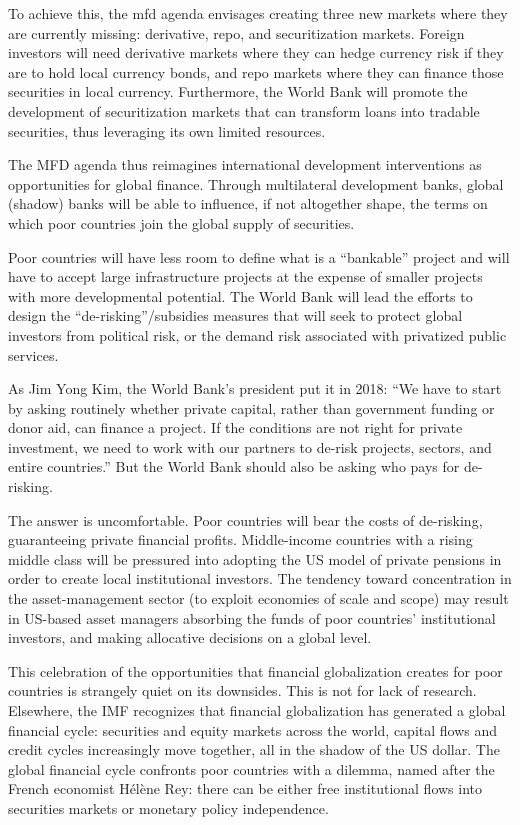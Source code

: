 \documentclass[
]{book}
\begin{document}
To achieve this, the mfd agenda envisages creating three new markets where they are currently missing: derivative, repo, and securitization markets. Foreign investors will need derivative markets where they can hedge currency risk if they are to hold local currency bonds, and repo markets where they can finance those securities in local currency. Furthermore, the World Bank will promote the development of securitization markets that can transform loans into tradable securities, thus leveraging its own limited resources.

The MFD agenda thus reimagines international development interventions as opportunities for global finance. Through multilateral development banks, global (shadow) banks will be able to influence, if not altogether shape, the terms on which poor countries join the global supply of securities.

Poor countries will have less room to define what is a ``bankable'' project and will have to accept large infrastructure projects at the expense of smaller projects with more developmental potential. The World Bank will lead the efforts to design the ``de-risking''/subsidies measures that will seek to protect global investors from political risk, or the demand risk associated with privatized public services.

As Jim Yong Kim, the World Bank's president put it in 2018: ``We have to start by asking routinely whether private capital, rather than government funding or donor aid, can finance a project. If the conditions are not right for private investment, we need to work with our partners to de-risk projects, sectors, and entire countries.'' But the World Bank should also be asking who pays for de-risking.

The answer is uncomfortable. Poor countries will bear the costs of de-risking, guaranteeing private financial profits. Middle-income countries with a rising middle class will be pressured into adopting the US model of private pensions in order to create local institutional investors. The tendency toward concentration in the asset-management sector (to exploit economies of scale and scope) may result in US-based asset managers absorbing the funds of poor countries' institutional investors, and making allocative decisions on a global level.

This celebration of the opportunities that financial globalization creates for poor countries is strangely quiet on its downsides. This is not for lack of research. Elsewhere, the IMF recognizes that financial globalization has generated a global financial cycle: securities and equity markets across the world, capital flows and credit cycles increasingly move together, all in the shadow of the US dollar. The global financial cycle confronts poor countries with a dilemma, named after the French economist Hélène Rey: there can be either free institutional flows into securities markets or monetary policy independence.
\end{document}
